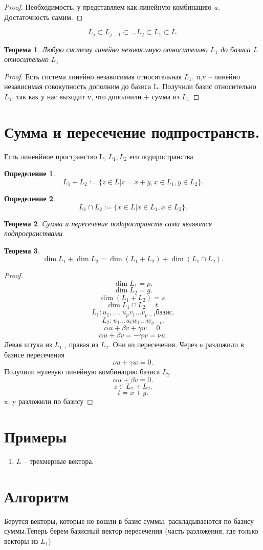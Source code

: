 \documentclass{scrartcl}
\newtheorem{theorem}{Теорема}
\newtheorem{definition}{Определение}
\begin{document}
\begin{proof}
    Необходимость. у представляем как линейную комбинацию $u$.
    Достаточность самим.
\end{proof}
\[
L_{j}\subset L_{j - 1}\subset \dots L_2 \subset L_1 \subset L
.\] 
\begin{theorem}
    Любую систему линейно независимую относительно $L_1$ до базиса L относительно $L_1$
\end{theorem}
\begin{proof}
    Есть система линейно независимая относительная $L_1$. u,v -- линейно независимая совокупность дополним до базиса L. Получили базис относительно $L_1$, так как у нас выходит v, что дополнили + сумма из  $L_1$
\end{proof}
\section{Сумма и пересечение подпространств.}
Есть линенйное пространство L, $L_1,L_2$  его подпространства
\begin{definition}
    \[
        L_1 + L_2 := \{z  \in L | z = x + y, x \in L_1, y \in L_2\}
    .\] 
\end{definition}
\begin{definition}
    \[
        L_1 \cap L_2 := \{x \in L | x \in L_1,x\in L_2\}
    .\] 
\end{definition}
\begin{theorem}
    Сумма и пересечение подпространств сами являются подпросранствами
\end{theorem}
\begin{theorem}
    \[
        \dim{L_1} + \dim{L_2} = \dim{(L_1 +  L_2)} + \dim{(L_1 \cap L_2)}
    .\] 
\end{theorem}
\begin{proof}
    \[
    \dim{L_1} = p
    .\] 
    \[
        \dim{L_2}  = g
    .\] 
    \[
        \dim{(L_1 + L_2)} = s
    .\] 
    \[
        \dim{L_1 \cap L_2} = t
    .\] 
   \[
       L_1 : u_1,\dots ,u_{p} v_1 \dots v_{p - t} \text{базис}
   .\] 
   \[
   L_2 : u_1 \dots u_{t} w_1 \dots w_{g - t}
   .\] 
   \[
   \alpha u + \beta v  + \gamma w =  0
   .\] 
   \[
   \alpha u + \beta v  = -\gamma w = \nu u
   .\] 
   Левая штука из $L_1$ , правая из $L_2$. Они из пересечения. Через $\nu$ разложили в базисе пересечения
    \[
   \nu u + \gamma w = 0
   .\] 
   Получили нулевую линейную комбинацию базиса $L_2$
   \[
   \alpha u + \beta v = 0
   .\] 
   \[
   z \in L_1 + L_2
   .\]  
   \[
   t = x + y 
   .\] 
   x, y разложили по базису
\end{proof}
\section{Примеры}
\begin{enumerate}
    \item $L$ -- трехмерные вектора.
\end{enumerate}
\section{Алгоритм}
Берутся векторы, которые не вошли в базис суммы, раскладываеются по базису суммы.Теперь берем базисный вектор пересечения (часть разложения, где только векторы из $L_1$)
\end{document}
